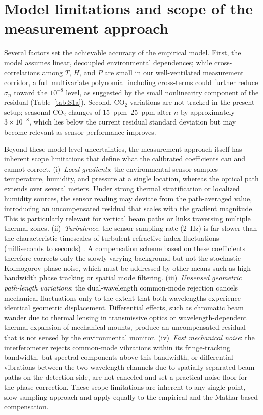 \documentclass[aps,prapplied,reprint,superscriptaddress]{revtex4-2}
\begin{document}
\section{Model limitations and scope of the measurement approach}
\label{sec:S4}

Several factors set the achievable accuracy of the empirical model. First, the model assumes linear, decoupled environmental dependences; while cross-correlations among $T$, $H$, and $P$ are small in our well-ventilated measurement corridor, a full multivariate polynomial including cross-terms could further reduce $\sigma_n$ toward the $10^{-8}$ level, as suggested by the small nonlinearity component of the residual (Table~\ref{tab:S1a}). Second, CO$_2$ variations are not tracked in the present setup; seasonal CO$_2$ changes of \SIrange{15}{25}{ppm} alter $n$ by approximately $3 \times 10^{-8}$, which lies below the current residual standard deviation but may become relevant as sensor performance improves.

Beyond these model-level uncertainties, the measurement approach itself has inherent scope limitations that define what the calibrated coefficients can and cannot correct. (i)~\textit{Local gradients}: the environmental sensor samples temperature, humidity, and pressure at a single location, whereas the optical path extends over several meters. Under strong thermal stratification or localized humidity sources, the sensor reading may deviate from the path-averaged value, introducing an uncompensated residual that scales with the gradient magnitude. This is particularly relevant for vertical beam paths or links traversing multiple thermal zones. (ii)~\textit{Turbulence}: the sensor sampling rate (\SI{2}{\hertz}) is far slower than the characteristic timescales of turbulent refractive-index fluctuations (milliseconds to seconds) \cite{tatarskii1961wave}. A compensation scheme based on these coefficients therefore corrects only the slowly varying background but not the stochastic Kolmogorov-phase noise, which must be addressed by other means such as high-bandwidth phase tracking or spatial mode filtering. (iii)~\textit{Unsensed geometric path-length variations}: the dual-wavelength common-mode rejection cancels mechanical fluctuations only to the extent that both wavelengths experience identical geometric displacement. Differential effects, such as chromatic beam wander due to thermal lensing in transmissive optics or wavelength-dependent thermal expansion of mechanical mounts, produce an uncompensated residual that is not sensed by the environmental monitor. (iv)~\textit{Fast mechanical noise}: the interferometer rejects common-mode vibrations within its fringe-tracking bandwidth, but spectral components above this bandwidth, or differential vibrations between the two wavelength channels due to spatially separated beam paths on the detection side, are not canceled and set a practical noise floor for the phase correction. These scope limitations are inherent to any single-point, slow-sampling approach and apply equally to the empirical and the Mathar-based compensation.
\end{document}
